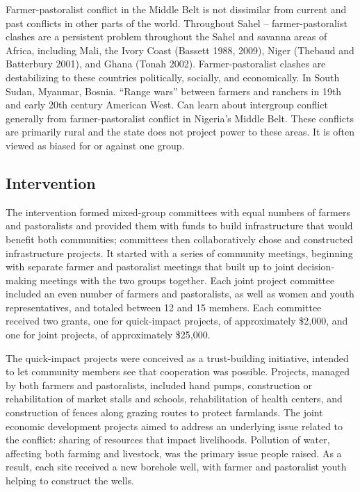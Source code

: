 \documentclass[11pt]{article}
\begin{document}
Farmer-pastoralist conflict in the Middle Belt is not dissimilar from
current and past conflicts in other parts of the world. Throughout Sahel
-- farmer-pastoralist clashes are a persistent problem throughout the
Sahel and savanna areas of Africa, including Mali, the Ivory Coast
(Bassett 1988, 2009), Niger (Thebaud and Batterbury 2001), and Ghana
(Tonah 2002). Farmer-pastoralist clashes are destabilizing to these
countries politically, socially, and economically. In South Sudan,
Myanmar, Bosnia. ``Range wars'' between farmers and ranchers in 19th and
early 20th century American West. Can learn about intergroup conflict
generally from farmer-pastoralist conflict in Nigeria's Middle Belt.
These conflicts are primarily rural and the state does not project power
to these areas. It is often viewed as biased for or against one group.

\hypertarget{intervention}{%
\subsection{Intervention}\label{intervention}}

The intervention formed mixed-group committees with equal numbers of
farmers and pastoralists and provided them with funds to build
infrastructure that would benefit both communities; committees then
collaboratively chose and constructed infrastructure projects. It
started with a series of community meetings, beginning with separate
farmer and pastoralist meetings that built up to joint decision-making
meetings with the two groups together. Each joint project committee
included an even number of farmers and pastoralists, as well as women
and youth representatives, and totaled between 12 and 15 members. Each
committee received two grants, one for quick-impact projects, of
approximately \$2,000, and one for joint projects, of approximately
\$25,000.

The quick-impact projects were conceived as a trust-building initiative,
intended to let community members see that cooperation was possible.
Projects, managed by both farmers and pastoralists, included hand pumps,
construction or rehabilitation of market stalls and schools,
rehabilitation of health centers, and construction of fences along
grazing routes to protect farmlands. The joint economic development
projects aimed to address an underlying issue related to the conflict:
sharing of resources that impact livelihoods. Pollution of water,
affecting both farming and livestock, was the primary issue people
raised. As a result, each site received a new borehole well, with farmer
and pastoralist youth helping to construct the wells.
\end{document}
